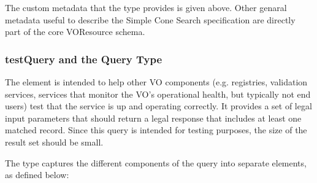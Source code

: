 \documentclass[11pt,a4paper]{ivoa}
\begin{document}

The custom metadata that the  type provides is given 
above. Other genaral metadata useful to describe the Simple Cone Search 
specification are directly part of the core VOResource schema.

\subsubsection{testQuery and the Query Type}

The  element is intended to help other VO components (e.g.
registries, validation services, services that monitor the VO's
operational health, but typically not end users) test that the service
is up and operating correctly. It provides a set of legal input
parameters that should return a legal response that includes at least
one matched record. Since this query is intended for testing purposes,
the size of the result set should be small.

The  type captures the different components of the query into
separate elements, as defined below:
\end{document}
